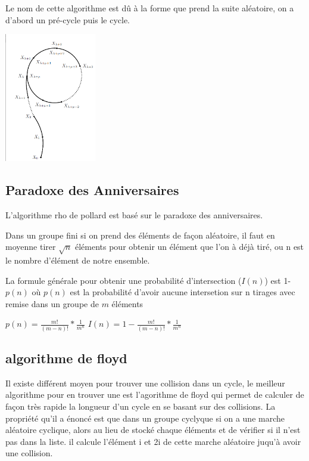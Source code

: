 \documentclass[a4paper,10pt]{report}
\begin{document}
Le nom de cette algorithme est dû à la forme que prend la suite aléatoire, on a d'abord un pré-cycle puis le cycle.

\begin{center}
 \includegraphics[width=4cm]{dessin_rho_pollard_bon.png}
\end{center}

\subsection{Paradoxe des Anniversaires}
L'algorithme rho de pollard est basé sur le paradoxe des anniversaires.

 Dans un groupe fini si on prend des éléments de façon aléatoire,
il faut en moyenne tirer $\sqrt{n}$ éléments pour obtenir un élément que l'on à déjà tiré, ou n est le nombre d'élément de notre ensemble.

La formule générale pour obtenir une probabilité d'intersection ($I(n)$) est 1-$p(n)$ où $p(n)$ est la probabilité d'avoir aucune intersetion sur n tirages avec remise dans un groupe de $m$ éléments
\begin{center}
    $p(n) = \frac{m!}{(m - n)!}*\frac{1}{m^n}$
    $I(n) = 1 - \frac{m!}{(m - n)!}*\frac{1}{m^n}$
\end{center}




\subsection{algorithme de floyd}

Il existe différent moyen pour trouver une collision dans un cycle, le meilleur algorithme pour en trouver
une est l'agorithme de floyd qui permet de calculer de façon très rapide la longueur d'un cycle en se basant sur des collisions.
La propriété qu'il a énoncé est que dans un groupe cyclyque si on a une marche aléatoire cyclique, alors au lieu de stocké chaque 
éléments et de vérifier si il n'est pas dans la liste. il calcule l'élément i et 2i de cette marche aléatoire juqu'à avoir une 
collision.
\end{document}
